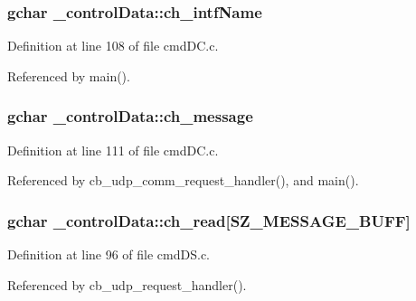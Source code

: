 \subsubsection[{\texorpdfstring{ch\+\_\+intf\+Name}{ch_intfName}}]{\setlength{\rightskip}{0pt plus 5cm}gchar \+\_\+control\+Data\+::ch\+\_\+intf\+Name}\hypertarget{struct__control_data_adac6cf5482e4bbabb442f8ab27e4bc62}{}\label{struct__control_data_adac6cf5482e4bbabb442f8ab27e4bc62}


Definition at line 108 of file cmd\+D\+C.\+c.



Referenced by main().

\subsubsection[{\texorpdfstring{ch\+\_\+message}{ch_message}}]{\setlength{\rightskip}{0pt plus 5cm}gchar \+\_\+control\+Data\+::ch\+\_\+message}\hypertarget{struct__control_data_a16162d5fe851704d7ea50ff16525b94c}{}\label{struct__control_data_a16162d5fe851704d7ea50ff16525b94c}


Definition at line 111 of file cmd\+D\+C.\+c.



Referenced by cb\+\_\+udp\+\_\+comm\+\_\+request\+\_\+handler(), and main().

\subsubsection[{\texorpdfstring{ch\+\_\+read}{ch_read}}]{\setlength{\rightskip}{0pt plus 5cm}gchar \+\_\+control\+Data\+::ch\+\_\+read\mbox{[}{\bf S\+Z\+\_\+\+M\+E\+S\+S\+A\+G\+E\+\_\+\+B\+U\+FF}\mbox{]}}\hypertarget{struct__control_data_a243b075becb92f2f37f56f60f738efb1}{}\label{struct__control_data_a243b075becb92f2f37f56f60f738efb1}


Definition at line 96 of file cmd\+D\+S.\+c.



Referenced by cb\+\_\+udp\+\_\+request\+\_\+handler().

